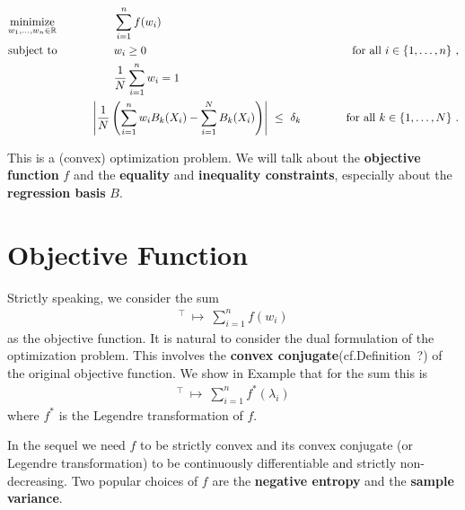 \begin{fproblem}
  \label{bw:1:primal}
\begin{align*}
    &\underset{w_1, \ldots, w_n \in \R}
    {\text{minimize}}
    &&\qquad\qquad
    \sum_{i = 1}^{n} 
    f(w_i)
    &&&
    \\
    &\text{subject to}
    &&\qquad\qquad
    w_i 
    \ge
    0
    &&&
    \qquad
    \text{for all}\ 
    i \in \left\{ 1, \ldots, n \right\}
    \,,
    \\
    & 
    &&\qquad\qquad
    \frac{1}{N}
    \sum_{i=1}^{n} 
    w_i
    =1
    \\
    & 
    &&\qquad
    \left| 
      \frac{1}{N} 
      \left( 
      \sum_{i = 1}^{n} 
      w_i
      B_k(X_i)
      -
      \sum_{i=1}^{N} 
      B_k(X_i)
      \right)
    \right|
    \ 
    \le 
    \ 
    \delta_k
    &&&
    \qquad
    \text{for all}\ 
    k \in \left\{ 1, \ldots, N \right\}
    \,.
\end{align*}
\end{fproblem}
This is a (convex) optimization problem. We will talk about the \textbf{objective function} $f$ and
the \textbf{equality} and \textbf{inequality constraints}, especially about the 
\textbf{regression basis} $B$.

\section*{Objective Function}
Strictly speaking, we consider the sum
\begin{gather}
  [w_1,\ldots,w_n]^\top
  \ 
  \mapsto
  \ 
  \sum_{i=1}^{n} 
  f(w_i)
\end{gather}
as the objective function. It is natural to consider the dual formulation of the optimization problem. This involves the \textbf{convex conjugate}(cf.Definition~?) of the original objective function. We show in Example that for the sum this is
\begin{gather}
  [\lambda_1,\ldots,\lambda_n]^\top
  \ 
  \mapsto
  \ 
  \sum_{i=1}^{n} 
  f^*(\lambda_i)
\end{gather}
where $f^*$ is the Legendre transformation of $f$.

In the sequel we need $f$ to be strictly convex and its convex conjugate (or Legendre transformation) to be continuously differentiable and strictly non-decreasing.
Two popular choices of $f$ are the \textbf{negative entropy} and the \textbf{sample variance}.
